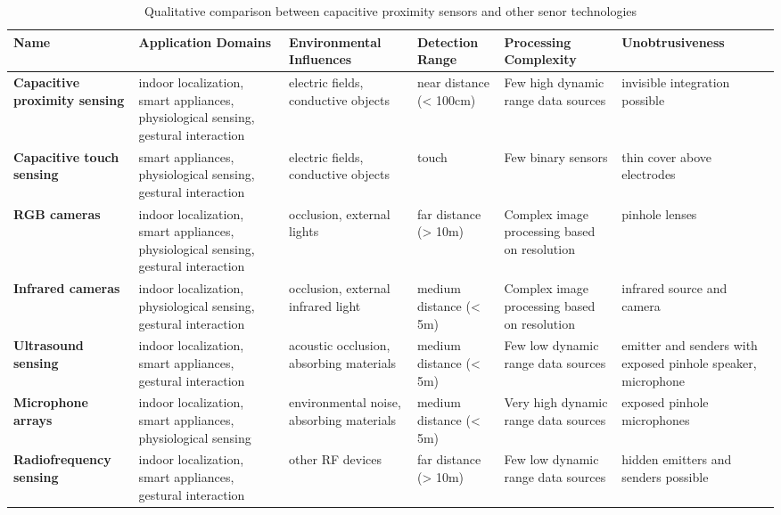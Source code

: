 \begin{table}[htbp]
  \centering
  \footnotesize
  \caption{Qualitative comparison between capacitive proximity sensors and other senor technologies}
    \begin{tabularx}{\linewidth}{Xp{4cm}XXXX}
    \toprule
    \textbf{Name} & \textbf{Application Domains} & \textbf{Environmental Influences} & \textbf{Detection Range} & \textbf{Processing Complexity} & \textbf{Unobtrusiveness} \\
    \midrule
    \textbf{Capacitive proximity sensing} & indoor localization, smart appliances, physiological sensing, gestural interaction & electric fields, conductive objects & near distance   (< 100cm) & Few high dynamic range data sources  & invisible integration possible \\ \addlinespace
    \textbf{Capacitive touch sensing} & smart appliances, physiological sensing, gestural interaction & electric fields, conductive objects & touch  & Few binary sensors & thin cover above electrodes \\ \addlinespace
    \textbf{RGB cameras } & indoor localization, smart appliances, physiological sensing, gestural interaction & occlusion, external lights & far distance     (> 10m) & Complex image processing based on resolution & pinhole lenses \\ \addlinespace
    \textbf{Infrared cameras} & indoor localization, physiological sensing, gestural interaction & occlusion, external infrared light & medium distance (< 5m) & Complex image processing based on resolution & infrared source and camera \\ \addlinespace
    \textbf{Ultrasound sensing} & indoor localization, smart appliances, gestural interaction & acoustic occlusion, absorbing materials & medium distance (< 5m) & Few low dynamic range data sources & emitter and senders with exposed pinhole speaker, microphone \\ \addlinespace
    \textbf{Microphone arrays} & indoor localization, smart appliances, physiological sensing & environmental noise, absorbing materials & medium distance (< 5m) & Very high dynamic range data sources & exposed pinhole microphones \\ \addlinespace
    \textbf{Radiofrequency sensing} & indoor localization, smart appliances, gestural interaction & other RF devices & far distance     (> 10m) & Few low dynamic range data sources & hidden emitters and senders possible \\
    \bottomrule
    \end{tabularx}%
  \label{tab:eval_sensortech}%
\end{table}%
 
